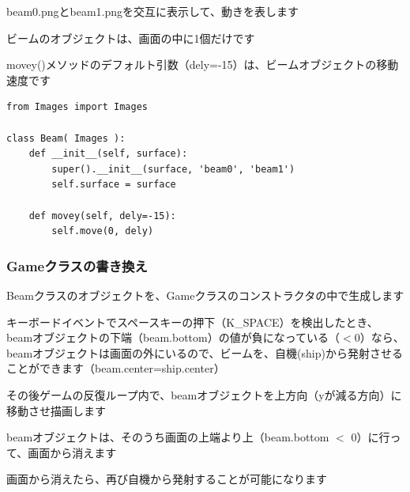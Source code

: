 \documentclass[uplatex,a4paper,11pt,oneside,openany]{jsbook}
\begin{document}
beam0.pngとbeam1.pngを交互に表示して、動きを表します

ビームのオブジェクトは、画面の中に1個だけです

movey()メソッドのデフォルト引数（dely=-15）は、ビームオブジェクトの移動速度です

\begin{lstlisting}[caption=Class Beam,label=p005]
from Images import Images

class Beam( Images ):
    def __init__(self, surface):
        super().__init__(surface, 'beam0', 'beam1')
        self.surface = surface

    def movey(self, dely=-15):
        self.move(0, dely)
\end{lstlisting}

\subsubsection{Gameクラスの書き換え}

Beamクラスのオブジェクトを、Gameクラスのコンストラクタの中で生成します

キーボードイベントでスペースキーの押下（K\_SPACE）を検出したとき、
beamオブジェクトの下端（beam.bottom）の値が負になっている（$<$0）なら、
beamオブジェクトは画面の外にいるので、ビームを、自機(ship)から発射させることができます（beam.center=ship.center）

その後ゲームの反復ループ内で、beamオブジェクトを上方向（yが減る方向）に移動させ描画します

beamオブジェクトは、そのうち画面の上端より上（beam.bottom $<$ 0）に行って、画面から消えます

画面から消えたら、再び自機から発射することが可能になります
\end{document}
